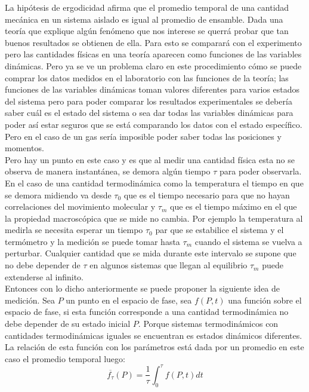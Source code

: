 La hipótesis de ergodicidad afirma que el promedio temporal de una cantidad mecánica en un sistema aislado es igual al promedio de ensamble. Dada una teoría que explique algún fenómeno que nos interese se querrá probar que tan buenos resultados se obtienen de ella. Para esto se comparará con el experimento pero las cantidades físicas en una teoría aparecen como funciones de las variables dinámicas. Pero ya se ve un problema claro en este procedimiento cómo se puede comprar los datos medidos en el laboratorio con las funciones de la teoría; las funciones de las variables dinámicas toman valores diferentes para varios estados del sistema pero para poder comparar los resultados experimentales se debería saber cuál es el estado del sistema o sea dar todas las variables dinámicas para poder así estar seguros que se está comparando los datos con el estado específico. Pero en el caso de un gas sería imposible poder saber todas las posiciones y momentos.
\\
Pero hay un punto en este caso y es que al medir una cantidad física esta no se observa de manera instantánea, se demora algún tiempo $\tau$ para poder observarla. En el caso de una cantidad termodinámica como la temperatura el tiempo en que se demora midiendo va desde $\tau_{0}$ que es el tiempo necesario para que no hayan correlaciones del movimiento molecular y  $\tau_{m}$ que es el tiempo máximo en el que la propiedad macroscópica que se mide no cambia. Por ejemplo la temperatura al medirla se necesita esperar un tiempo $\tau_{0}$ par que se estabilice el sistema y el termómetro y la medición se puede tomar hasta $\tau_{m}$ cuando el sistema se vuelva a perturbar. Cualquier cantidad que se mida durante este intervalo se supone que no debe depender de $\tau$ en algunos sistemas que llegan al equilibrio $\tau_{m}$ puede extenderse al infinito.
\\
Entonces con lo dicho anteriormente se puede proponer la siguiente idea de medición. Sea $P$ un punto en el espacio de fase, sea $f(P,t)$ una función sobre el espacio de fase, si esta función corresponde a una cantidad termodinámica no debe depender de su estado inicial $P$. Porque sistemas termodinámicos con cantidades termodinámicas iguales se encuentran es estados dinámicos diferentes. La relación de esta función con los parámetros está dada por un promedio en este caso el promedio temporal luego:
\begin{equation}
\overline{f_{\tau}}(P)= \frac{1}{\tau} \int_{0}^{\tau} f(P,t) dt
\end{equation}
 
